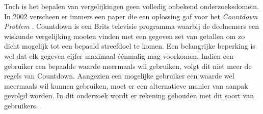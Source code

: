 \documentclass[Main.tex]{subfiles}
\begin{document}
Toch is het bepalen van vergelijkingen geen volledig onbekend onderzoeksdomein. In 2002 verscheen er immers een paper die een oplossing gaf voor het \textit{Countdown Problem} \cite{countdown}. Countdown is een Brits televisie programma waarbij de deelnemers een wiskunde vergelijking moeten vinden met een gegeven set van getallen om zo dicht mogelijk tot een bepaald streefdoel te komen. Een belangrijke beperking is wel dat elk gegeven cijfer maximaal \'e\'enmalig mag voorkomen. Indien een gebruiker een bepaalde waarde meermaals wil gebruiken, volgt dit niet meer de regels van Countdown. Aangezien een mogelijke gebruiker een waarde wel meermaals wil kunnen gebruiken, moet er een alternatieve manier van aanpak gevolgd worden. In dit onderzoek wordt er rekening gehouden met dit soort van gebruikers.
\end{document}
